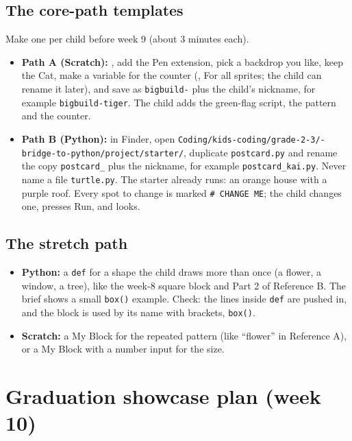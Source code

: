 \documentclass[track=junior,level=3,teacher]{kidscode}
\begin{document}
\subsection{The core-path templates}
Make one per child before week 9 (about 3 minutes each).
\begin{itemize}[itemsep=2pt]
  \item \textbf{Path A (Scratch):} , add the Pen extension, pick a backdrop you like, keep
        the Cat, make a variable for the counter (, For all sprites; the child can
        rename it later), and save as \texttt{bigbuild-} plus the child's nickname, for example
        \texttt{bigbuild-tiger}. The child adds the green-flag script, the pattern and the counter.
  \item \textbf{Path B (Python):} in Finder, open
        \texttt{Coding/\allowbreak kids-coding/\allowbreak grade-2-3/-bridge-to-python/\allowbreak project/\allowbreak starter/},
        duplicate \texttt{postcard.py} and rename the copy \texttt{postcard\_} plus the nickname, for example
        \texttt{postcard\_kai.py}. Never name a file \texttt{turtle.py}. The starter already runs: an orange
        house with a purple roof. Every spot to change is marked \texttt{\# CHANGE ME}; the child changes one,
        presses Run, and looks.
\end{itemize}

\subsection{The stretch path}
\begin{itemize}[itemsep=2pt]
  \item \textbf{Python:} a \texttt{def} for a shape the child draws more than once (a flower, a window, a
        tree), like the week-8 square block and Part 2 of Reference B. The brief shows a small \texttt{box()}
        example. Check: the lines inside \texttt{def} are pushed in, and the block is used by its name with
        brackets, \texttt{box()}.
  \item \textbf{Scratch:} a My Block for the repeated pattern (like \enquote{flower} in Reference A), or a My
        Block with a number input for the size.
\end{itemize}

\section{Graduation showcase plan (week 10)}
\end{document}

